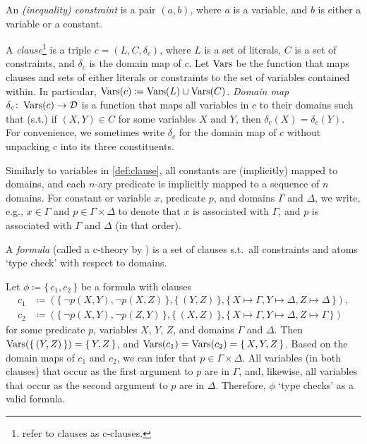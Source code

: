 \begin{definition}[Constraint]\label{def:constraint}
  An \emph{(inequality) constraint} is a pair $(a, b)$, where $a$ is a variable,
  and $b$ is either a variable or a constant.
\end{definition}

\begin{definition}[Clause]\label{def:clause}
  A \emph{clause}\footnote{\citet{DBLP:conf/ijcai/BroeckTMDR11} refer to clauses
    as c-clauses.} is a triple $c = (L, C, \delta_c)$, where $L$ is a set of
  literals, $C$ is a set of constraints, and $\delta_c$ is the domain map of
  $c$. Let $\operatorname{Vars}$ be the function that maps clauses and sets of either literals
  or constraints to the set of variables contained within. In particular,
  $\operatorname{Vars}(c) \coloneqq \operatorname{Vars}(L) \cup \operatorname{Vars}(C)$. \emph{Domain map}
  $\delta_{c}\colon \operatorname{Vars}(c) \to \mathcal{D}$ is a function that maps all
  variables in $c$ to their domains such that (s.t.) if $(X, Y) \in C$ for some
  variables $X$ and $Y$, then $\delta_c(X) = \delta_c(Y)$. For convenience, we
  sometimes write $\delta_c$ for the domain map of $c$ without unpacking $c$
  into its three constituents.
\end{definition}

Similarly to variables in \cref{def:clause}, all constants are (implicitly)
mapped to domains, and each $n$-ary predicate is implicitly mapped to a sequence
of $n$ domains. For constant or variable $x$, predicate $p$, and domains
$\Gamma$ and $\Delta$, we write, e.g., $x \in \Gamma$ and
$p \in \Gamma \times \Delta$ to denote that $x$ is associated with $\Gamma$, and
$p$ is associated with $\Gamma$ and $\Delta$ (in that order).

\begin{definition}[Formula]\label{def:formula}
  A \emph{formula} (called a c-theory by \citet{DBLP:conf/ijcai/BroeckTMDR11})
  is a set of clauses s.t.\ all constraints and atoms `type check' with respect
  to domains.
\end{definition}

\begin{example}\label{example:first}
  Let $\phi \coloneqq \{\, c_1, c_2 \,\}$ be a formula with clauses
  \begin{align*}
    c_1 &\coloneqq (\{\, \neg p(X, Y), \neg p(X, Z) \,\}, \{\, (Y, Z) \,\}, \{\, X \mapsto \Gamma, Y \mapsto \Delta, Z \mapsto \Delta \,\}),\\
    c_2 &\coloneqq (\{\, \neg p(X, Y), \neg p(Z, Y) \,\}, \{\, (X, Z) \,\}, \{\, X \mapsto \Gamma, Y \mapsto \Delta, Z \mapsto \Gamma \,\})
  \end{align*}
  for some predicate $p$, variables $X$, $Y$, $Z$, and domains $\Gamma$ and
  $\Delta$. Then $\operatorname{Vars}(\{\, (Y, Z) \,\}) = \{\, Y, Z \,\}$, and
  $\operatorname{Vars}(c_{1}) = \operatorname{Vars}(c_{2}) = \{\, X, Y, Z \,\}$. Based on the domain maps of
  $c_{1}$ and $c_{2}$, we can infer that $p \in \Gamma \times \Delta$. All
  variables (in both clauses) that occur as the first argument to $p$ are in
  $\Gamma$, and, likewise, all variables that occur as the second argument to
  $p$ are in $\Delta$. Therefore, $\phi$ `type checks' as a valid formula.
\end{example}

